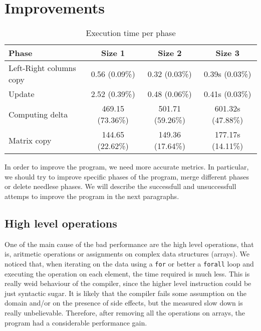 \documentclass{article}
\begin{document}
\section{Improvements} \label{sec:improvements}

\begin{table}
\centering
\begin{tabular}{|l|c|c|c|}
\hline
Phase & Size 1 & Size 2 & Size 3 \\
\hline
Left-Right columns copy & 0.56 (0.09\%) & 0.32 (0.03\%) & 0.39s (0.03\%) \\
\hline
Update & 2.52 (0.39\%) & 0.48 (0.06\%) & 0.41s (0.03\%) \\
\hline
Computing delta & 469.15 (73.36\%) & 501.71 (59.26\%) & 601.32s (47.88\%) \\
\hline
Matrix copy & 144.65 (22.62\%) & 149.36 (17.64\%) & 177.17s (14.11\%) \\
\hline
\end{tabular}
\caption{Execution time per phase} \label{tab:timeperphasecomparison}
\end{table}

In order to improve the program, we need more accurate metrics. In particular, we should try to improve specific phases of the program, merge different phases or delete needlese phases. We will describe the successfull and unsuccessfull attemps to improve the program in the next paragraphs.

\subsection{High level operations}
One of the main cause of the bad performance are the high level operations, that is, aritmetic operations or assignments on complex data structures (arrays). We noticed that, when iterating on the data using a \texttt{for} or better a \texttt{forall} loop and executing the operation on each element, the time required is much less. This is really weid behaviour of the compiler, since the higher level instruction could be just syntactic sugar. It is likely that the compiler fails some assumption on the domain and/or on the presence of side effects, but the measured slow down is really unbelievable. Therefore, after removing all the operations on arrays, the program had a considerable performance gain.
\end{document}
